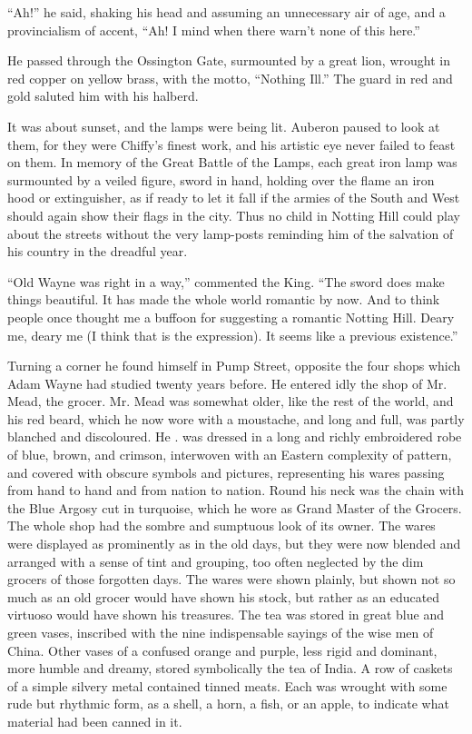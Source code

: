 \documentclass{book}
\begin{document}
“Ah!” he said, shaking his head and assuming an unnecessary air of age, and a provincialism of accent, “Ah! I mind when there warn’t none of this here.”

He passed through the Ossington Gate, surmounted by a great lion, wrought in red copper on yellow brass, with the motto, “Nothing Ill.” The guard in red and gold saluted him with his halberd.

It was about sunset, and the lamps were being lit. Auberon paused to look at them, for they were Chiffy’s finest work, and his artistic eye never failed to feast on them. In memory of the Great Battle of the Lamps, each great iron lamp was surmounted by a veiled figure, sword in hand, holding over the flame an iron hood or extinguisher, as if ready to let it fall if the armies of the South and West should again show their flags in the city. Thus no child in Notting Hill could play about the streets without the very lamp-posts reminding him of the salvation of his country in the dreadful year.

“Old Wayne was right in a way,” commented the King. “The sword does make things beautiful. It has made the whole world romantic by now. And to think people once thought me a buffoon for suggesting a romantic Notting Hill. Deary me, deary me (I think that is the expression). It seems like a previous existence.”

Turning a corner he found himself in Pump Street, opposite the four shops which Adam Wayne had studied twenty years before. He entered idly the shop of Mr. Mead, the grocer. Mr. Mead was somewhat older, like the rest of the world, and his red beard, which he now wore with a moustache, and long and full, was partly blanched and discoloured. He . was dressed in a long and richly embroidered robe of blue, brown, and crimson, interwoven with an Eastern complexity of pattern, and covered with obscure symbols and pictures, representing his wares passing from hand to hand and from nation to nation. Round his neck was the chain with the Blue Argosy cut in turquoise, which he wore as Grand Master of the Grocers. The whole shop had the sombre and sumptuous look of its owner. The wares were displayed as prominently as in the old days, but they were now blended and arranged with a sense of tint and grouping, too often neglected by the dim grocers of those forgotten days. The wares were shown plainly, but shown not so much as an old grocer would have shown his stock, but rather as an educated virtuoso would have shown his treasures. The tea was stored in great blue and green vases, inscribed with the nine indispensable sayings of the wise men of China. Other vases of a confused orange and purple, less rigid and dominant, more humble and dreamy, stored symbolically the tea of India. A row of caskets of a simple silvery metal contained tinned meats. Each was wrought with some rude but rhythmic form, as a shell, a horn, a fish, or an apple, to indicate what material had been canned in it.
\end{document}
